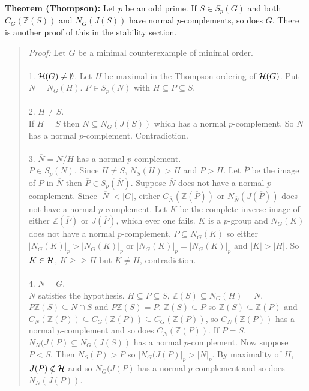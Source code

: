 {\bf Theorem (Thompson):}  Let $p$ be an odd prime.  If $S \in S_p(G)$ and both $C_G({\mathbb Z}(S))$ and $N_G(J(S))$ have normal $p$-complements, so does $G$.  There is another proof of this in the
stability section.
\begin{quote}
\emph{Proof:}
Let $G$ be a minimal counterexample of minimal order.
\\
\\
1. ${\cal H}(G) \neq \emptyset$. Let $H$ be maximal in the Thompson ordering of ${\cal H}(G)$.  Put $N = N_G(H)$.
$P \in S_p(N)$ with $H \subseteq P \subseteq S$.
\\
\\
2. $H \neq S$.
\\
If $H = S$ then $N \subseteq N_G(J(S))$ which has a normal $p$-complement.
So $N$ has a normal $p$-complement.
Contradiction.
\\
\\
3. ${\overline N} = N/H$ has a normal $p$-complement.
\\
$P \in S_p(N)$.  Since $H \neq S$, $N_S(H) > H$ and $P > H$.
Let ${\overline P}$ be the image of $P$ in ${\overline N}$ then ${\overline P} \in S_p({\overline N})$.
Suppose ${\overline N}$ does not have a normal $p$-complement.  Since $|{\overline N}| < |G|$, either
$C_{\overline N}({\mathbb Z}({\overline P}))$ or $N_{\overline N}(J({\overline P}))$ does not have a normal $p$-complement.
Let $K$ be the complete inverse image of either ${\mathbb Z}({\overline P})$ or $J({\overline P})$, which ever one fails.
$K$ is a $p$-group and $N_G(K)$ does not have a normal $p$-complement.
$P \subseteq N_G(K)$ so either $|N_G(K)|_p > |N_G(K)|_p$ or
$|N_G(K)|_p = |N_G(K)|_p$ and $|K| > |H|$.  So $K \in {\cal H}$, $K \geq \geq H$ but $K \neq H$, contradiction.
\\
\\
4. $N = G$.
\\
$N$ satisfies the hypothesis. $H \subseteq P \subseteq S$, ${\mathbb Z}(S) \subseteq N_G(H) = N$. $P {\mathbb Z}(S) \subseteq N \cap S$
and $P {\mathbb Z}(S) = P$.  ${\mathbb Z}(S) \subseteq P$ so ${\mathbb Z}(S) \subseteq {\mathbb Z}(P)$ and
$C_N({\mathbb Z}(P)) \subseteq C_G({\mathbb Z}(P)) \subseteq C_G({\mathbb Z}(P))$, so $C_N({\mathbb Z}(P))$ has
a normal $p$-complement and so does $C_N({\mathbb Z}(P))$.
If $P = S$, $N_N(J(P) \subseteq N_G(J(S))$ has a normal $p$-complement.
Now suppose $P < S$.  Then $N_S(P) > P$ so $|N_G(J(P)|_p > |N|_p$.
By maximality of $H$, $J(P) \notin {\cal H}$
and so $N_G(J(P)$ has a normal $p$-complement and so does $N_N(J(P))$.

\end{quote}
